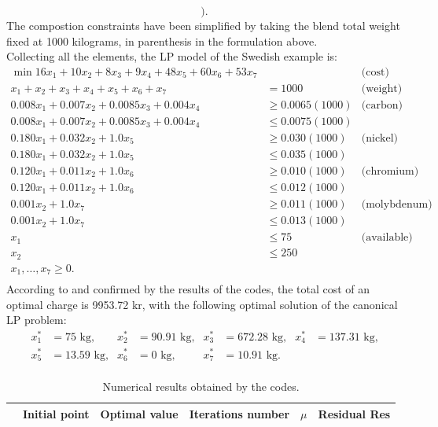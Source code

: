 \documentclass[a4paper,10 pt,titlepage,twoside]{book}
\theoremstyle{plain}
\theoremstyle{definition}
\theoremstyle{remark}
\begin{document}
{{\begin{equation*}
	\Bigg).
\end{equation*}		
The compostion constraints have been simplified by taking the blend total weight fixed at 1000 kilograms, in parenthesis in the formulation above.\\ Collecting all the elements, the LP model of the Swedish example is: 
\begin{align*}
\min16x_{1}+10x_{2}+8x_{3}+9x_{4}+48x_{5}+60x_{6}+53x_{7}& &\text{(cost)}&\\
x_{1}+x_{2}+x_{3}+x_{4}+x_{5}+x_{6} + x_{7}&= 1000&\text{(weight)}&\\
0.008x_{1}+0.007x_{2}+0.0085x_{3}+0.004x_{4}&\geq 0.0065(1000)&\text{(carbon)}&\\
0.008x_{1}+0.007x_{2} + 0.0085x_{3} + 0.004x_{4}&\leq 0.0075(1000)&\\
0.180x_{1}+0.032x_{2} + 1.0x_{5}&\geq 0.030(1000)& \text{(nickel)}&\\
0.180x_{1}+0.032x_{2} + 1.0x_{5}&\leq 0.035(1000)&\\
0.120x_{1}+0.011x_{2} + 1.0x_{6}&\geq 0.010(1000)& \text{(chromium)}&\\
0.120x_{1}+0.011x_{2} + 1.0x_{6}&\leq 0.012(1000)&\\
0.001x_{2} + 1.0x_{7}&\geq 0.011(1000)& \text{(molybdenum)}&\\
0.001x_{2} + 1.0x_{7}&\leq 0.013(1000)&\\
x_{1}&\leq 75&\text{(available)}&\\
x_{2}&\leq 250 &&\\
x_{1},\dots, x_{7}\geq 0.\\
\end{align*}
According to \cite{RR} and confirmed by the results of the codes, the total cost of an optimal charge is 9953.72 kr, with the following optimal solution of the canonical LP problem:
\begin{align*}
x_{1}^{*} &=  75\text{ kg,} & x_{2}^{*}&=  90.91\text{ kg,} & x_{3}^{*} &= 672.28 \text{ kg,} & x_{4}^{*} &= 137.31 \text{ kg,}\\
x_{5}^{*} &= 13.59 \text{ kg,}& x_{6}^{*}&= 0\text{ kg,}  & x_{7}^{*} &= 10.91 \text{ kg.} &&\\
\end{align*}
\begin{table}[t]\caption{\label{table:SWE}Numerical results obtained by the codes.}
	\begin{tabular}{cclcll}
		\hline		\textbf{} & \textbf{Initial point} & \multicolumn{1}{c}{\textbf{Optimal value}} & \textbf{Iterations number} & \multicolumn{1}{c}{\textbf{$\mu$}} & \multicolumn{1}{c}{\textbf{Residual} Res} \\ \hline

\end{tabular}
\end{table}}}
\end{document}

